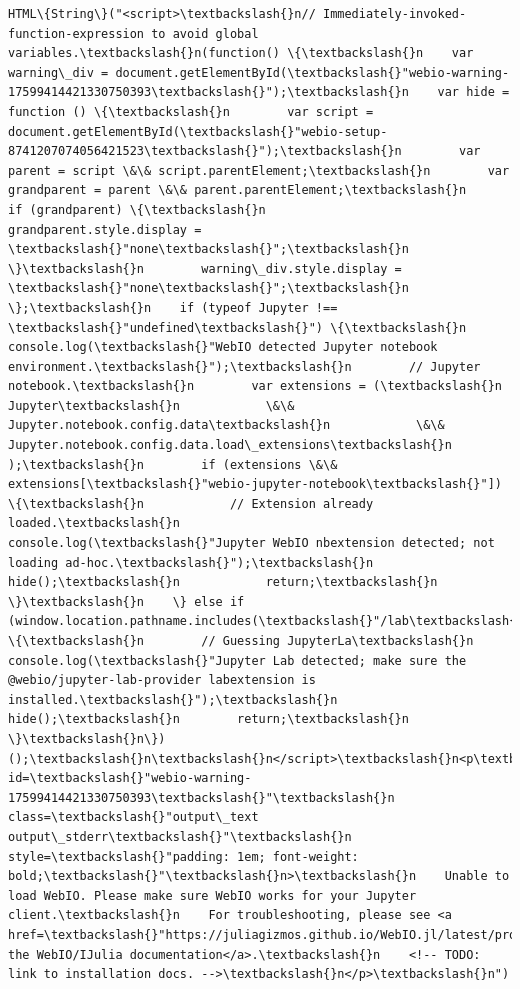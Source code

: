 \documentclass[11pt]{article}
\begin{document}
    
    \begin{Verbatim}[commandchars=\\\{\}]
HTML\{String\}("<script>\textbackslash{}n// Immediately-invoked-function-expression to avoid global variables.\textbackslash{}n(function() \{\textbackslash{}n    var warning\_div = document.getElementById(\textbackslash{}"webio-warning-17599414421330750393\textbackslash{}");\textbackslash{}n    var hide = function () \{\textbackslash{}n        var script = document.getElementById(\textbackslash{}"webio-setup-8741207074056421523\textbackslash{}");\textbackslash{}n        var parent = script \&\& script.parentElement;\textbackslash{}n        var grandparent = parent \&\& parent.parentElement;\textbackslash{}n        if (grandparent) \{\textbackslash{}n            grandparent.style.display = \textbackslash{}"none\textbackslash{}";\textbackslash{}n        \}\textbackslash{}n        warning\_div.style.display = \textbackslash{}"none\textbackslash{}";\textbackslash{}n    \};\textbackslash{}n    if (typeof Jupyter !== \textbackslash{}"undefined\textbackslash{}") \{\textbackslash{}n        console.log(\textbackslash{}"WebIO detected Jupyter notebook environment.\textbackslash{}");\textbackslash{}n        // Jupyter notebook.\textbackslash{}n        var extensions = (\textbackslash{}n            Jupyter\textbackslash{}n            \&\& Jupyter.notebook.config.data\textbackslash{}n            \&\& Jupyter.notebook.config.data.load\_extensions\textbackslash{}n        );\textbackslash{}n        if (extensions \&\& extensions[\textbackslash{}"webio-jupyter-notebook\textbackslash{}"]) \{\textbackslash{}n            // Extension already loaded.\textbackslash{}n            console.log(\textbackslash{}"Jupyter WebIO nbextension detected; not loading ad-hoc.\textbackslash{}");\textbackslash{}n            hide();\textbackslash{}n            return;\textbackslash{}n        \}\textbackslash{}n    \} else if (window.location.pathname.includes(\textbackslash{}"/lab\textbackslash{}")) \{\textbackslash{}n        // Guessing JupyterLa\textbackslash{}n        console.log(\textbackslash{}"Jupyter Lab detected; make sure the @webio/jupyter-lab-provider labextension is installed.\textbackslash{}");\textbackslash{}n        hide();\textbackslash{}n        return;\textbackslash{}n    \}\textbackslash{}n\})();\textbackslash{}n\textbackslash{}n</script>\textbackslash{}n<p\textbackslash{}n    id=\textbackslash{}"webio-warning-17599414421330750393\textbackslash{}"\textbackslash{}n    class=\textbackslash{}"output\_text output\_stderr\textbackslash{}"\textbackslash{}n    style=\textbackslash{}"padding: 1em; font-weight: bold;\textbackslash{}"\textbackslash{}n>\textbackslash{}n    Unable to load WebIO. Please make sure WebIO works for your Jupyter client.\textbackslash{}n    For troubleshooting, please see <a href=\textbackslash{}"https://juliagizmos.github.io/WebIO.jl/latest/providers/ijulia/\textbackslash{}">\textbackslash{}n    the WebIO/IJulia documentation</a>.\textbackslash{}n    <!-- TODO: link to installation docs. -->\textbackslash{}n</p>\textbackslash{}n")
    \end{Verbatim}
\end{document}
